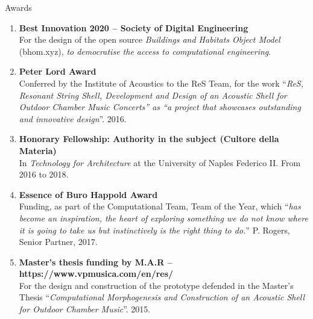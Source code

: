 \documentclass{resume}
\begin{document}
    \begin{rSection}{Awards}
    \begin{enumerate}[leftmargin=0.45cm, itemsep=0em, topsep=0.5em, parsep=0.2em]
        \item \textbf{Best Innovation 2020 – Society of Digital Engineering} \\
    For the design of the open source \textit{Buildings and Habitats Object Model} (bhom.xyz), \textit{to democratise the access to computational engineering}.
        \item \textbf{Peter Lord Award} \\
    Conferred by the Institute of Acoustics to the ReS Team, for the work “\textit{ReS, Resonant String Shell, Development and Design of an Acoustic Shell for Outdoor Chamber Music Concerts” as “a project that showcases outstanding and innovative design}”. 2016.
        \item \textbf{Honorary Fellowship: Authority in the subject (Cultore della Materia)} \\
    In \textit{Technology for Architecture} at the University of Naples Federico II.
    From 2016 to 2018.
        \item \textbf{Essence of Buro Happold Award} \\
    Funding, as part of the Computational Team, Team of the Year, which “\textit{has become an inspiration, the heart of exploring something we do not know where it is going to take us but instinctively is the right thing to do.}” P. Rogers, Senior Partner, 2017.
        \item \textbf{Master’s thesis funding by M.A.R – https://www.vpmusica.com/en/res/}  \\
    For the design and construction of the prototype defended in the Master’s Thesis “\textit{Computational Morphogenesis and Construction of an Acoustic Shell for Outdoor Chamber Music}”. 2015.
    \end{enumerate}
\end{rSection}
\end{document}
